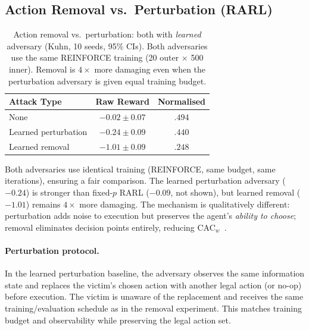 \documentclass{article}
\begin{document}
\subsection{Action Removal vs.\ Perturbation (RARL)}

\begin{table}[ht]
\centering
\caption{Action removal vs.\ perturbation: both with \emph{learned} adversary (Kuhn, 10 seeds, 95\% CIs). Both adversaries use the same REINFORCE training (20 outer $\times$ 500 inner). Removal is $4\times$ more damaging even when the perturbation adversary is given equal training budget.}
\label{tab:rarl}
\begin{tabular}{lcc}
\toprule
Attack Type & Raw Reward & Normalised \\
\midrule
None & $-0.02 \pm 0.07$ & $.494$ \\
Learned perturbation & $-0.24 \pm 0.09$ & $.440$ \\
Learned removal & $\mathbf{-1.01 \pm 0.09}$ & $\mathbf{.248}$ \\
\bottomrule
\end{tabular}
\end{table}

Both adversaries use identical training (REINFORCE, same budget, same iterations), ensuring a fair comparison. The learned perturbation adversary ($-0.24$) is stronger than fixed-$p$ RARL ($-0.09$, not shown), but learned removal ($-1.01$) remains $4\times$ more damaging. The mechanism is qualitatively different: perturbation adds noise to execution but preserves the agent's \emph{ability to choose}; removal eliminates decision points entirely, reducing CAC$_w$~\citep{pinto2017robust,tessler2019action}.

\paragraph{Perturbation protocol.}
In the learned perturbation baseline, the adversary observes the same information state and replaces the victim's chosen action with another legal action (or no-op) before execution. The victim is unaware of the replacement and receives the same training/evaluation schedule as in the removal experiment. This matches training budget and observability while preserving the legal action set.

\end{document}
